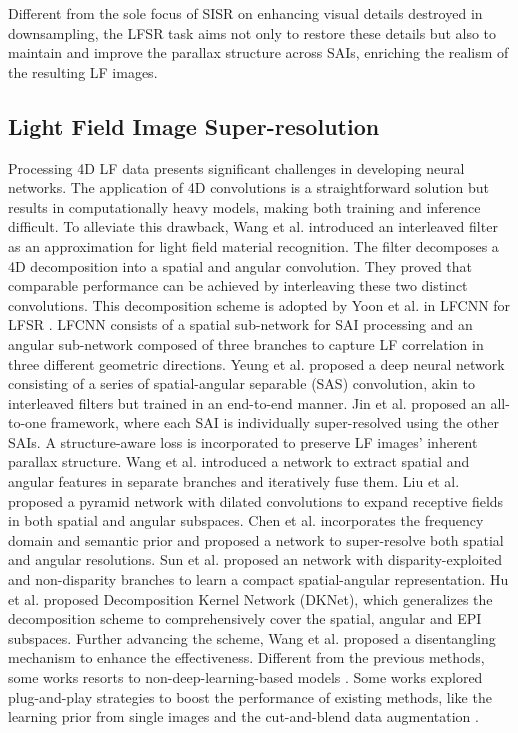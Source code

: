 Different from the sole focus of SISR on enhancing visual details destroyed in downsampling, the LFSR task aims not only to restore these details but also to maintain and improve the parallax structure across SAIs, enriching the realism of the resulting LF images.

\subsection{Light Field Image Super-resolution}
Processing 4D LF data presents significant challenges in developing neural networks. The application of 4D convolutions is a straightforward solution but results in computationally heavy models, making both training and inference difficult. To alleviate this drawback, Wang et al. \cite{wangLFRecognition_ECCV2016} introduced an interleaved filter as an approximation for light field material recognition. The filter decomposes a 4D decomposition into a spatial and angular convolution. They proved that comparable performance can be achieved by interleaving these two distinct convolutions. This decomposition scheme is adopted by Yoon et al. in LFCNN for LFSR \cite{yoon2017LFCNN}. LFCNN consists of a spatial sub-network for SAI processing and an angular sub-network composed of three branches to capture LF correlation in three different geometric directions. Yeung et al. \cite{yeungSAS_LFSR2019} proposed a deep neural network consisting of a series of spatial-angular separable (SAS) convolution, akin to interleaved filters but trained in an end-to-end manner. Jin et al. \cite{jinLFSSRATO_2020} proposed an all-to-one framework, where each SAI is individually super-resolved using the other SAIs. A structure-aware loss is incorporated to preserve LF images' inherent parallax structure. Wang et al. \cite{wangLfInterNet_ECCV2020} introduced a network to extract spatial and angular features in separate branches and iteratively fuse them. Liu et al. \cite{liuLFIINet_TMM2021} proposed a pyramid network with dilated convolutions to expand receptive fields in both spatial and angular subspaces. Chen et al. \cite{chen_TMM2021} incorporates the frequency domain and semantic prior and proposed a network to super-resolve both spatial and angular resolutions. Sun et al. \cite{sun_TMM2022} proposed an network with disparity-exploited and non-disparity branches to learn a compact spatial-angular representation. Hu et al.\cite{huDKNet_TIM2022} proposed Decomposition Kernel Network (DKNet), which generalizes the decomposition scheme to comprehensively cover the spatial, angular and EPI subspaces. Further advancing the scheme, Wang et al. \cite{wangDistgSSR_TIP2022} proposed a disentangling mechanism to enhance the effectiveness. Different from the previous methods, some works resorts to non-deep-learning-based models \cite{rossi2018geometry, ghassab_TMM2019}. Some works explored plug-and-play strategies to boost the performance of existing methods, like the learning prior from single images \cite{wangBoosting_TCI2023} and the cut-and-blend data augmentation \cite{xiaoCutMIB_CVPR2023}.

